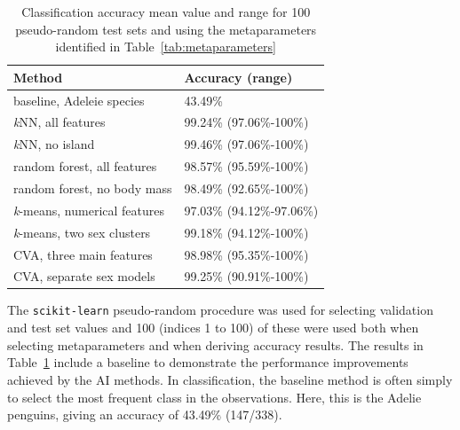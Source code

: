 \documentclass[a4paper, 11pt]{article}
\begin{document}
\begin{table} %
  \small
  \begin{center}
  \vspace{-3.5\baselineskip} %
  \setlength{\abovecaptionskip}{5pt}
  \setlength{\belowcaptionskip}{5pt}
  \fontsize{10}{10}\selectfont %
  \begin{tabular}{l|l}
  \textbf{Method} & \textbf{Accuracy (range)}\\
  \hline
  baseline, Adeleie species & 43.49\% \\
  \hline
  \textit{k}NN, all features & 99.24\% (97.06\%-100\%)\\
  \textit{k}NN, no island &	99.46\% (97.06\%-100\%)\\
  \hline
  random forest, all features	& 98.57\% (95.59\%-100\%)\\
  random forest, no body mass & 98.49\% (92.65\%-100\%)\\
  \hline
  \textit{k}-means, numerical features & 97.03\% (94.12\%-97.06\%)\\
  \textit{k}-means, two sex clusters  & 99.18\% (94.12\%-100\%)\\
  \hline
  CVA, three main features & 98.98\% (95.35\%-100\%)\\
  CVA, separate sex models & 99.25\% (90.91\%-100\%)\\
  \hline
  \end{tabular}
  \vspace{-2\baselineskip} %
  \end{center} 
  \caption{\centering\linespread{0.8}\selectfont Classification accuracy mean value and range for 100 pseudo-random test sets 
  and using the metaparameters identified in Table~\ref{tab:metaparameters}}
  \vspace{-1.2\baselineskip} %
  \label{tab:results}
\end{table} 

The \texttt{scikit-learn}  
pseudo-random procedure was used for selecting validation and test set values and 100 (indices 1 to 100) of these were used 
both when selecting metaparameters and when deriving accuracy results.
The results in Table~\ref{tab:results} include a baseline to demonstrate the 
performance improvements achieved by the AI methods. In classification, the
baseline method is often simply to select the most frequent class in the observations. Here, 
this is the Adelie penguins, giving an accuracy of 43.49\% (147/338). 
\end{document}
